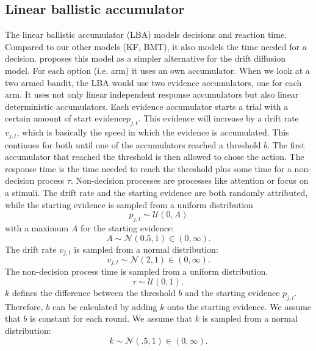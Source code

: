 \subsection{Linear ballistic accumulator}
The linear ballistic accumulator (LBA) models decisions and reaction time. Compared to our other models (KF, BMT), it also models the time needed for a decision. \citep{brown2008simplest} proposes this model as a simpler alternative for the drift diffusion model. For each option (i.e. arm) it uses an own accumulator. When we look at a two armed bandit, the LBA would use two evidence accumulators, one for each arm. It uses not only linear independent response accumulators but also linear deterministic accumulators. Each evidence accumulator starts a trial with a certain amount of start evidence$p_{j,t}$. This evidence will increase by a drift rate $v_{j,t}$, which is basically the speed in which the evidence is accumulated. This continues for both until one of the accumulators reached a threshold $b$. The first accumulator that reached the threshold is then allowed to chose the action. The response time is the time needed to reach the threshold plus some time for a non-decision process $\tau$. Non-decision processes are processes like attention or focus on a stimuli. 
The drift rate and the starting evidence are both randomly attributed, while the starting evidence is sampled from a uniform distribution
\begin{equation}
    p_{j,t} \sim \mathcal{U}(0,A)
\end{equation}
with a maximum $A$ for the starting evidence: 
\begin{equation}
    A \sim \mathcal{N}(0.5,1) \in (0, \infty).
\end{equation}
The drift rate $v_{j,t}$ is sampled from a normal distribution: 
\begin{equation}
    v_{j,t} \sim \mathcal{N}(2,1) \in (0, \infty).
\end{equation}
The non-decision process time is sampled from a uniform distribution. 
\begin{equation}
    \tau \sim \mathcal{U}(0,1),
\end{equation}
$k$ defines the difference between the threshold $b$ and the starting evidence $p_{j,t}$. Therefore, $b$ can be calculated by adding $k$ onto the starting evidence. We assume that $b$ is constant for each round. We assume that $k$ is sampled from a normal distribution:   
\begin{equation}
    k \sim \mathcal{N}(.5,1) \in (0, \infty).
\end{equation}
%